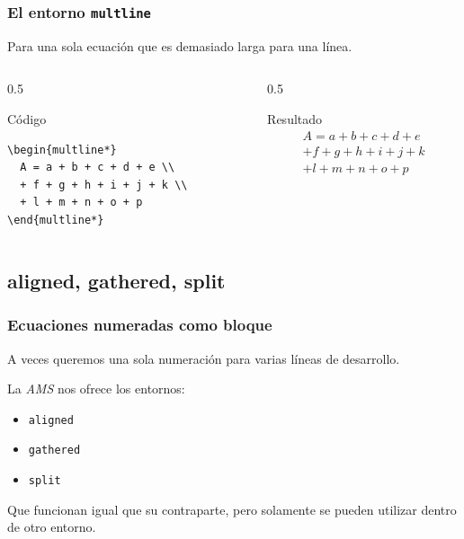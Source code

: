 \documentclass[12pt,aspectratio=169,ignorenonframetext]{ltxbeamer}
\begin{document}
\begin{frame}[fragile]
\frametitle{El entorno \texttt{multline}}
Para una sola ecuación que es demasiado larga para una línea.

\begin{columns}
\begin{column}{0.5\textwidth}
    \begin{block}{Código}
\begin{verbatim}
\begin{multline*}
  A = a + b + c + d + e \\
  + f + g + h + i + j + k \\
  + l + m + n + o + p
\end{multline*}
\end{verbatim}
        \end{block}
    \end{column}

    \begin{column}{0.5\textwidth}
        \begin{exampleblock}{Resultado}
            \begin{multline*}
                A = a + b + c + d + e \\
                + f + g + h + i + j + k \\
                + l + m + n + o + p
            \end{multline*}
        \end{exampleblock}
    \end{column}
\end{columns}
\end{frame}



\subsection{aligned, gathered, split}
\begin{frame}[fragile]
\frametitle{Ecuaciones numeradas como bloque}
A veces queremos una sola numeración para varias líneas de desarrollo.

La \emph{AMS} nos ofrece los entornos:

\begin{itemize}
    \item \texttt{aligned} 
    \item \texttt{gathered} 
    \item \texttt{split} 
\end{itemize}

\pause
Que funcionan igual que su contraparte, pero solamente se pueden utilizar dentro de otro entorno.
\end{frame}
\end{document}
